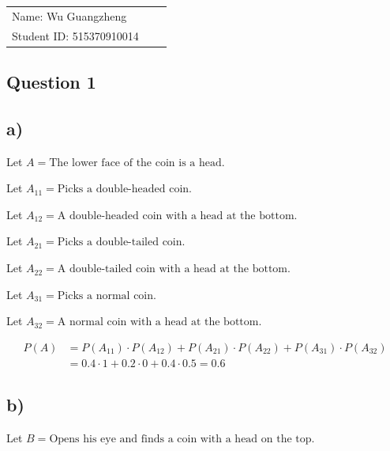 \documentclass[12pt]{article}
\begin{document}
\vfill
\begin{large}

\begin{table}[h!]
\flushleft
\begin{tabular}{lll}
Name: Wu Guangzheng \hspace*{2em}\\
Student ID: 515370910014

\end{tabular}
\end{table}
\end{large}
\newpage
\begin{flushleft}


\section{Question 1} 

\subsection*{a)}

\qquad Let $A =  \text{The lower face of the coin is a head}$. 

\qquad Let $A_{11} =  \text{Picks a double-headed coin}$.

\qquad Let $A_{12} =  \text{A double-headed coin with a head at the bottom}$.

\qquad Let $A_{21} =  \text{Picks a double-tailed coin}$.

\qquad Let $A_{22} =  \text{A double-tailed coin with a head at the bottom}$.

\qquad Let $A_{31} =  \text{Picks a normal coin}$.

\qquad Let $A_{32} =  \text{A normal coin with a head at the bottom}$.

\vspace{-0.5cm}

\begin{align*}
P(A) &= P(A_{11}) \cdot P(A_{12}) + P(A_{21}) \cdot P(A_{22}) + P(A_{31}) \cdot P(A_{32})\\
&= 0.4 \cdot 1 + 0.2 \cdot 0 + 0.4 \cdot 0.5 = 0.6
\end{align*}


\subsection*{b)}

\qquad Let $B = \text{Opens his eye and finds a coin with a head on the top}$.


\end{flushleft}
\end{document}
